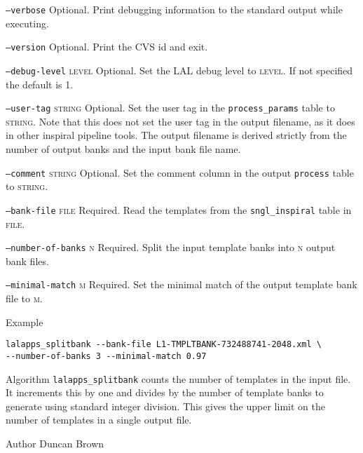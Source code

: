 \begin{entry}
\begin{entry}
\item[\texttt{--verbose}] Optional. Print debugging information to the
standard output while executing.

\item[\texttt{--version}] Optional.  Print the CVS id and exit.

\item[\texttt{--debug-level} \textsc{level}] Optional. Set the LAL debug
level to \textsc{level}. If not specified the default is 1.

\item[\texttt{--user-tag} \textsc{string}] Optional. Set the user tag in
the \texttt{process\_params} table to \textsc{string}. Note that this does
not set the user tag in the output filename, as it does in other inspiral
pipeline tools. The output filename is derived strictly from the number of
output banks and the input bank file name.

\item[\texttt{--comment} \textsc{string}] Optional. Set the comment column in
the output \texttt{process} table to \textsc{string}.

\item[\texttt{--bank-file} \textsc{file}] Required. Read the templates from
the \texttt{sngl\_inspiral} table in \textsc{file}.

\item[\texttt{--number-of-banks} \textsc{n}] Required. Split the input
template banks into \textsc{n} output bank files.

\item[\texttt{--minimal-match} \textsc{m}] Required. Set the minimal match of
the output template bank file to \textsc{m}.
\end{entry}

\item[Example]
\begin{verbatim}
lalapps_splitbank --bank-file L1-TMPLTBANK-732488741-2048.xml \
--number-of-banks 3 --minimal-match 0.97
\end{verbatim}

\item[Algorithm]
\texttt{lalapps\_splitbank} counts the number of templates in the input file.
It increments this by one and divides by the number of template banks to
generate using standard integer division. This gives the upper limit on the
number of templates in a single output file.

\item[Author] 
Duncan Brown
\end{entry}

